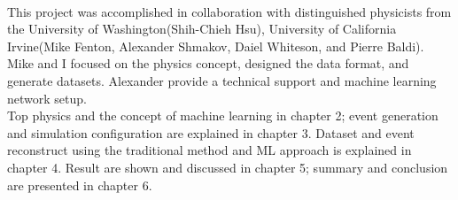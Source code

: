 \\
This project was accomplished in collaboration with distinguished physicists from the University of Washington(Shih-Chieh Hsu), University of California Irvine(Mike Fenton, Alexander Shmakov, Daiel Whiteson, and Pierre Baldi). Mike and I focused on the physics concept, designed the data format, and generate datasets. Alexander provide a technical support and machine learning network setup. 
\\
Top physics and the concept of machine learning in chapter 2; event generation and simulation configuration are explained in chapter 3. Dataset and event reconstruct using the traditional method and ML approach is explained in chapter 4. Result are shown and discussed in chapter 5; summary and conclusion are presented in chapter 6.


